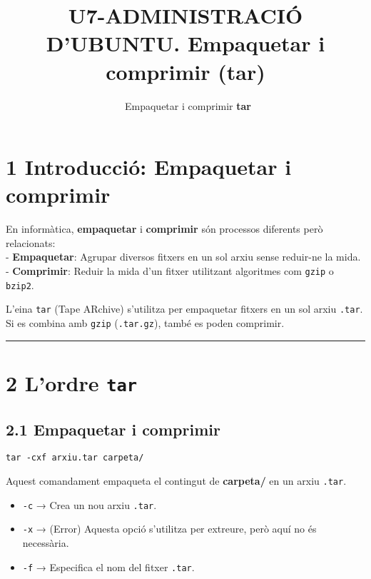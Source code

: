 \documentclass[
  12 pt,
  a4paper,
]{article}
\title{U7-ADMINISTRACIÓ D'UBUNTU. Empaquetar i comprimir (tar)}
\subtitle{~Empaquetar i comprimir \textbf{tar}}
\author{}
\date{\vspace{-2.5em}}
\providecommand{\tightlist}{%
  \setlength{\itemsep}{0pt}\setlength{\parskip}{0pt}}
\begin{document}
\maketitle

\section{1 Introducció: Empaquetar i
comprimir}\label{introducciuxf3-empaquetar-i-comprimir}

En informàtica, \textbf{empaquetar} i \textbf{comprimir} són processos
diferents però relacionats:\\
- \textbf{Empaquetar}: Agrupar diversos fitxers en un sol arxiu sense
reduir-ne la mida.\\
- \textbf{Comprimir}: Reduir la mida d'un fitxer utilitzant algoritmes
com \texttt{gzip} o \texttt{bzip2}.

L'eina \texttt{tar} (Tape ARchive) s'utilitza per empaquetar fitxers en
un sol arxiu \texttt{.tar}. Si es combina amb \texttt{gzip}
(\texttt{.tar.gz}), també es poden comprimir.

\begin{center}\rule{0.5\linewidth}{0.5pt}\end{center}

\section{\texorpdfstring{2 L'ordre
\texttt{tar}}{2 L'ordre tar}}\label{lordre-tar}

\subsection{2.1 Empaquetar i comprimir}\label{empaquetar-i-comprimir}

\texttt{tar\ -cxf\ arxiu.tar\ carpeta/}

Aquest comandament empaqueta el contingut de \textbf{carpeta/} en un
arxiu \texttt{.tar}.

\begin{itemize}
\tightlist
\item
  \texttt{-c} → Crea un nou arxiu \texttt{.tar}.\\
\item
  \texttt{-x} → (Error) Aquesta opció s'utilitza per extreure, però aquí
  no és necessària.\\
\item
  \texttt{-f} → Especifica el nom del fitxer \texttt{.tar}.
\end{itemize}
\end{document}
